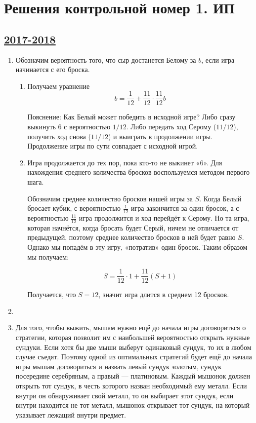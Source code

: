 \section{Решения контрольной номер 1. ИП}

\subsection[2017-2018]{\hyperref[sec:kr_01_ip_2017_2018]{2017-2018}}
\label{sec:sol_kr_01_ip_2017_2018}



\begin{enumerate}

\item Обозначим вероятность того, что сыр достанется Белому за $b$, если игра начинается с его броска.

\begin{enumerate}
\item Получаем уравнение
\[
	b = \frac{1}{12} + \frac{11}{12} \cdot \frac{11}{12} b
\]

Пояснение: Как Белый может победить в исходной игре? Либо сразу выкинуть 6 с вероятностью $1/12$.
Либо передать ход Серому ($11/12$), получить ход снова ($11/12$) и выиграть в продолжении игры.
Продолжение игры по сути совпадает с исходной игрой.

\item Игра продолжается до тех пор, пока кто-то не выкинет «6».
Для нахождения среднего количества бросков воспользуемся методом первого шага.

Обозначим среднее количество бросков нашей игры за $S$.
Когда Белый бросает кубик, с вероятностью $\frac{1}{12}$ игра закончится за один бросок,
а с вероятностью $\frac{11}{12}$ игра продолжится и ход перейдёт к Серому.
Но та игра, которая начнётся, когда бросать будет Серый, ничем не отличается от предыдущей,
поэтому среднее количество бросков в ней будет равно $S$.
Однако мы попадём в эту игру, «потратив» один бросок. Таким образом мы получаем:

\[
S = \frac{1}{12} \cdot 1 + \frac{11}{12}(S +1)
\]

Получается, что $S = 12$, значит игра длится в среднем 12 бросков.
\end{enumerate}

\item

\item Для того, чтобы выжить, мышам нужно ещё до начала игры договориться о стратегии,
которая позволит им с наибольшей вероятностью открыть нужные сундуки.
Если хотя бы две мыши выберут одинаковый сундук, то их в любом случае съедят.
Поэтому одной из оптимальных стратегий будет ещё до начала игры мышам договориться и назвать левый сундук золотым,
сундук посередине серебряным, а правый — платиновым.
Каждый мышонок должен открыть тот сундук, в честь которого назван необходимый ему металл.
Если внутри он обнаруживает свой металл, то он выбирает этот сундук,
если внутри находится не тот металл, мышонок открывает тот сундук,
на который указывает лежащий внутри предмет.


\end{enumerate}
